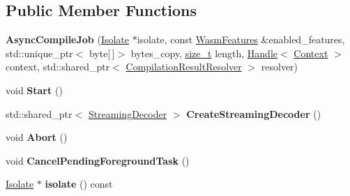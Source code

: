 \subsection*{Public Member Functions}
\begin{DoxyCompactItemize}
\item 
\mbox{\label{classv8_1_1internal_1_1wasm_1_1AsyncCompileJob_afd5f32ea7f90e5cb335c5d65ed593768}} 
{\bfseries Async\+Compile\+Job} (\mbox{\hyperlink{classv8_1_1internal_1_1Isolate}{Isolate}} $\ast$isolate, const \mbox{\hyperlink{structv8_1_1internal_1_1wasm_1_1WasmFeatures}{Wasm\+Features}} \&enabled\+\_\+features, std\+::unique\+\_\+ptr$<$ byte\mbox{[}$\,$\mbox{]}$>$ bytes\+\_\+copy, \mbox{\hyperlink{classsize__t}{size\+\_\+t}} length, \mbox{\hyperlink{classv8_1_1internal_1_1Handle}{Handle}}$<$ \mbox{\hyperlink{classv8_1_1internal_1_1Context}{Context}} $>$ context, std\+::shared\+\_\+ptr$<$ \mbox{\hyperlink{classv8_1_1internal_1_1wasm_1_1CompilationResultResolver}{Compilation\+Result\+Resolver}} $>$ resolver)
\item 
\mbox{\label{classv8_1_1internal_1_1wasm_1_1AsyncCompileJob_a0a4a22d3cbec712dad3fe9a6c3846106}} 
void {\bfseries Start} ()
\item 
\mbox{\label{classv8_1_1internal_1_1wasm_1_1AsyncCompileJob_a5323277e186f3ae7566581ed5e08e518}} 
std\+::shared\+\_\+ptr$<$ \mbox{\hyperlink{classv8_1_1internal_1_1wasm_1_1StreamingDecoder}{Streaming\+Decoder}} $>$ {\bfseries Create\+Streaming\+Decoder} ()
\item 
\mbox{\label{classv8_1_1internal_1_1wasm_1_1AsyncCompileJob_a1969624508b5f667f28f0bb9ff9dfb1a}} 
void {\bfseries Abort} ()
\item 
\mbox{\label{classv8_1_1internal_1_1wasm_1_1AsyncCompileJob_aa84200caacc713311e166e63a9b3759f}} 
void {\bfseries Cancel\+Pending\+Foreground\+Task} ()
\item 
\mbox{\label{classv8_1_1internal_1_1wasm_1_1AsyncCompileJob_a63b00b6733c1470d1ab5d592880bce73}} 
\mbox{\hyperlink{classv8_1_1internal_1_1Isolate}{Isolate}} $\ast$ {\bfseries isolate} () const
\end{DoxyCompactItemize}
